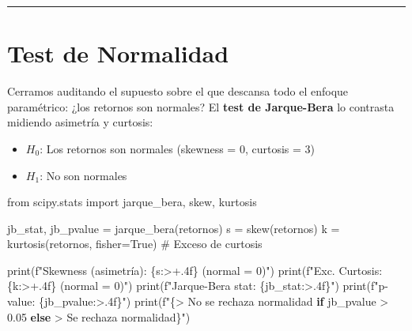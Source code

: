 \documentclass[
  spanish,
  letterpaper,
  DIV=11,
  numbers=noendperiod]{scrreprt}
\newenvironment{Shaded}{\begin{snugshade}}{\end{snugshade}}
\newcommand{\BuiltInTok}[1]{\textcolor[rgb]{0.00,0.23,0.31}{#1}}
\newcommand{\CommentTok}[1]{\textcolor[rgb]{0.37,0.37,0.37}{#1}}
\newcommand{\ControlFlowTok}[1]{\textcolor[rgb]{0.00,0.23,0.31}{\textbf{#1}}}
\newcommand{\FloatTok}[1]{\textcolor[rgb]{0.68,0.00,0.00}{#1}}
\newcommand{\ImportTok}[1]{\textcolor[rgb]{0.00,0.46,0.62}{#1}}
\newcommand{\NormalTok}[1]{\textcolor[rgb]{0.00,0.23,0.31}{#1}}
\newcommand{\OperatorTok}[1]{\textcolor[rgb]{0.37,0.37,0.37}{#1}}
\newcommand{\SpecialCharTok}[1]{\textcolor[rgb]{0.37,0.37,0.37}{#1}}
\newcommand{\SpecialStringTok}[1]{\textcolor[rgb]{0.13,0.47,0.30}{#1}}
\newcommand{\StringTok}[1]{\textcolor[rgb]{0.13,0.47,0.30}{#1}}
\newcommand{\VariableTok}[1]{\textcolor[rgb]{0.07,0.07,0.07}{#1}}
\providecommand{\tightlist}{%
  \setlength{\itemsep}{0pt}\setlength{\parskip}{0pt}}
\begin{document}
\begin{center}\rule{0.5\linewidth}{0.5pt}\end{center}

\chapter{Test de Normalidad}\label{test-de-normalidad}

Cerramos auditando el supuesto sobre el que descansa todo el enfoque
paramétrico: ¿los retornos son normales? El \textbf{test de Jarque-Bera}
lo contrasta midiendo asimetría y curtosis:

\begin{itemize}
\tightlist
\item
  \(H_0\): Los retornos son normales (skewness = 0, curtosis = 3)
\item
  \(H_1\): No son normales
\end{itemize}

\label{normalidad}
\begin{Shaded}
\begin{Highlighting}[]
\ImportTok{from}\NormalTok{ scipy.stats }\ImportTok{import}\NormalTok{ jarque\_bera, skew, kurtosis}

\NormalTok{jb\_stat, jb\_pvalue }\OperatorTok{=}\NormalTok{ jarque\_bera(retornos)}
\NormalTok{s }\OperatorTok{=}\NormalTok{ skew(retornos)}
\NormalTok{k }\OperatorTok{=}\NormalTok{ kurtosis(retornos, fisher}\OperatorTok{=}\VariableTok{True}\NormalTok{)  }\CommentTok{\# Exceso de curtosis}

\BuiltInTok{print}\NormalTok{(}\SpecialStringTok{f"Skewness (asimetría):    }\SpecialCharTok{\{}\NormalTok{s}\SpecialCharTok{:\textgreater{}+.4f\}}\SpecialStringTok{  (normal = 0)"}\NormalTok{)}
\BuiltInTok{print}\NormalTok{(}\SpecialStringTok{f"Exc. Curtosis:           }\SpecialCharTok{\{}\NormalTok{k}\SpecialCharTok{:\textgreater{}+.4f\}}\SpecialStringTok{  (normal = 0)"}\NormalTok{)}
\BuiltInTok{print}\NormalTok{(}\SpecialStringTok{f"Jarque{-}Bera stat:        }\SpecialCharTok{\{}\NormalTok{jb\_stat}\SpecialCharTok{:\textgreater{}.4f\}}\SpecialStringTok{"}\NormalTok{)}
\BuiltInTok{print}\NormalTok{(}\SpecialStringTok{f"p{-}value:                 }\SpecialCharTok{\{}\NormalTok{jb\_pvalue}\SpecialCharTok{:\textgreater{}.4f\}}\SpecialStringTok{"}\NormalTok{)}
\BuiltInTok{print}\NormalTok{(}\SpecialStringTok{f"}\SpecialCharTok{\{}\StringTok{\textquotesingle{}{-}\textgreater{} No se rechaza normalidad\textquotesingle{}} \ControlFlowTok{if}\NormalTok{ jb\_pvalue }\OperatorTok{\textgreater{}} \FloatTok{0.05} \ControlFlowTok{else} \StringTok{\textquotesingle{}{-}\textgreater{} Se rechaza normalidad\textquotesingle{}}\SpecialCharTok{\}}\SpecialStringTok{"}\NormalTok{)}
\end{Highlighting}
\end{Shaded}
\end{document}
